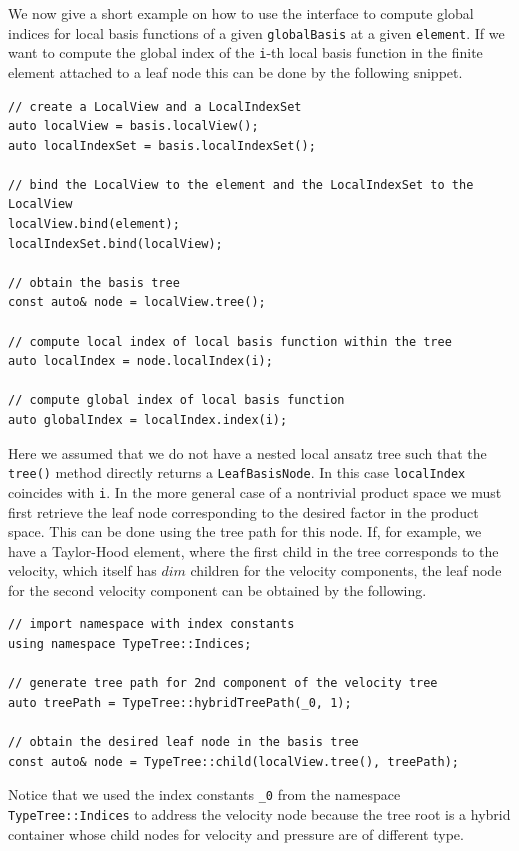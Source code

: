 \documentclass[a4paper,10pt,headings=normal,bibliography=totoc]{scrartcl}
\begin{document}
We now give a short example on how to use the interface
to compute global indices for local basis functions
of a given \texttt{globalBasis} at a given \texttt{element}.
If we want to compute the global index of the \texttt{i}-th
local basis function in the finite element attached to
a leaf node this can be done by the following snippet.

\begin{lstlisting}
// create a LocalView and a LocalIndexSet
auto localView = basis.localView();
auto localIndexSet = basis.localIndexSet();

// bind the LocalView to the element and the LocalIndexSet to the LocalView
localView.bind(element);
localIndexSet.bind(localView);

// obtain the basis tree
const auto& node = localView.tree();

// compute local index of local basis function within the tree
auto localIndex = node.localIndex(i);

// compute global index of local basis function
auto globalIndex = localIndex.index(i);
\end{lstlisting}

Here we assumed that we do not have a nested local ansatz tree
such that the \texttt{tree()} method directly returns a \texttt{LeafBasisNode}.
In this case \texttt{localIndex} coincides with \texttt{i}.
In the more general case of a nontrivial product space
we must first retrieve the leaf node corresponding to
the desired factor in the product space. This can be done
using the tree path for this node. If, for example,
we have a Taylor-Hood element, where the first
child in the tree corresponds to the velocity,
which itself has $dim$ children for the velocity
components, the leaf node for the second velocity
component can be obtained by the following.

\begin{lstlisting}
// import namespace with index constants
using namespace TypeTree::Indices;

// generate tree path for 2nd component of the velocity tree
auto treePath = TypeTree::hybridTreePath(_0, 1);

// obtain the desired leaf node in the basis tree
const auto& node = TypeTree::child(localView.tree(), treePath);
\end{lstlisting}

Notice that we used the index constants \texttt{\_0}
from the namespace \texttt{TypeTree::Indices}
to address the velocity node because the
tree root is a hybrid container whose child nodes
for velocity and pressure are of different type.
\end{document}
